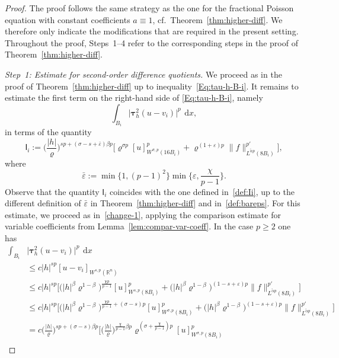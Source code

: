 \documentclass[10pt,a4paper]{amsart}
\renewcommand{\d}{\:\! \mathrm{d}}
\renewcommand{\epsilon}{\varepsilon}
\renewcommand{\rho}{\varrho}
\newcommand\sfI{{\boldsymbol{\mathsf I}}}
\begin{document}
\begin{proof}
The proof follows the same strategy as the one for the fractional Poisson equation
with constant coefficients $a\equiv1$, cf.\ Theorem~\ref{thm:higher-diff}.
We therefore only indicate the modifications that are required in the present setting.
Throughout the proof, Steps~1--4 refer to the corresponding steps in the proof of
Theorem~\ref{thm:higher-diff}.


\smallskip
\noindent
\textit{Step~1: Estimate for second-order difference quotients.}
We proceed as in the proof of Theorem~\ref{thm:higher-diff} up to
inequality~\eqref{Eq:tau-h-B-i}. 
It remains to estimate the first term on the right-hand side of
\eqref{Eq:tau-h-B-i}, namely
\[
     \int_{B_i} \big|\boldsymbol\tau_h^2 (u - v_i)\big|^p \,\d x,
\]
in terms of the quantity
\[
    \sfI_i
    :=
    \Big(\frac{|h|}{\rho}\Big)^{sp+(\sigma-s+\bar\epsilon)\beta p} 
    \Big[
        \rho^{\sigma p} [u]_{W^{\sigma,p}(16B_i)}^p
        +
        \rho^{(1+\epsilon)p}
        \|f\|_{L^{\tilde\alpha p}(8B_i)}^{p'}
    \Big],
\]
where
\begin{equation}\label{def:bareps}
    \bar\epsilon
    :=
    \min\{1,(p-1)^2\}
    \min\bigg\{\epsilon,\frac{\chi}{p-1}\bigg\}.
\end{equation}
Observe that the quantity $\sfI_i$ coincides with the one defined
in~\eqref{def:Ii}, up to the different definition of $\bar\epsilon$
in Theorem~\ref{thm:higher-diff} and in~\eqref{def:bareps}.
For this estimate, we proceed as in~\eqref{change-1}, applying
the comparison estimate for variable coefficients from
Lemma~\ref{lem:compar-var-coeff}.
In the case $p\ge2$ one has
\begin{align*}
    \int_{B_i} &
    \big|\boldsymbol\tau_h^2 (u - v_i)\big|^p \,\d x\\
    &\le
    c |h|^{sp} [u-v_i]_{W^{s,p}(\mathbb{R}^n)} \\
    &\le
    c |h|^{sp} \Big[
    \big(|h|^\beta\rho^{1-\beta}\big)^{\frac{\chi p}{p-1}}[u]^p_{W^{s,p}(8B_i)} 
    +
    \big(|h|^\beta\rho^{1-\beta}\big)^{(1-s+\epsilon)p}
    \|f\|_{L^{\tilde\alpha p}(8B_i)}^{p'} \Big] \\
    &\le
    c |h|^{sp} \Big[
    \big(|h|^\beta\rho^{1-\beta}\big)^{\frac{\chi p}{p-1}+(\sigma-s)p}[u]^p_{W^{\sigma,p}(8B_i)}  +
    \big(|h|^\beta\rho^{1-\beta}\big)^{(1-s+\epsilon)p}
    \|f\|_{L^{\tilde\alpha p}(8B_i)}^{p'} \Big] \\
    &=
    c \Big(\frac{|h|}{\rho}\Big)^{sp+(\sigma-s)\beta p} 
    \bigg[ 
    \Big(\frac{|h|}{\rho}\Big)^{\frac{\chi}{p-1}\beta p} \rho^{(\sigma+\frac{\chi}{p-1})p} [u]^p_{W^{\sigma,p}(8B_i)} \\

\end{align*}
\end{proof}
\end{document}
